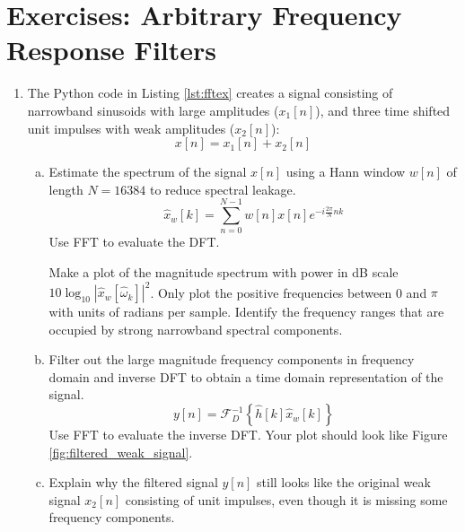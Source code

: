 \newpage
\section{Exercises: Arbitrary Frequency Response Filters}

\begin{enumerate}
\item The Python code in Listing \ref{lst:fftex} creates a signal consisting of narrowband sinusoids with large amplitudes ($x_1[n]$), and three time shifted unit impulses with weak amplitudes ($x_2[n]$):
  \begin{equation}
    x[n]=x_1[n]+x_2[n]
    \end{equation}

  
  
  \begin{enumerate}[a)]
  \item Estimate the spectrum of the signal $x[n]$ using a Hann window $w[n]$ of length $N=16384$ to reduce spectral leakage.
    \begin{equation}
      \hat{x}_w[k]= \sum_{n=0}^{N-1}w[n]x[n]e^{-i\frac{2\pi}{N}nk}
      \end{equation}
      Use FFT to evaluate the DFT.

    Make a plot of the magnitude spectrum with power in dB scale
    $10\log_{10}|\hat{x}_w[\hat{\omega}_k]|^2$. Only plot the positive
    frequencies between 0 and $\pi$ with units of radians per
    sample. Identify the frequency ranges that are occupied by strong
    narrowband spectral components.
    
  \item Filter out the large magnitude frequency components in
    frequency domain and inverse DFT to obtain a time domain
    representation of the signal.
    \begin{equation}
    y[n]= \mathcal{F}_D^{-1}\left\{ \hat{h}[k]\hat{x}_w[k] \right\}
    \end{equation}
    Use FFT to evaluate the inverse DFT. Your plot should look like
    Figure \ref{fig:filtered_weak_signal}.
    
    \item Explain why the filtered signal $y[n]$ still looks like the
      original weak signal $x_2[n]$ consisting of unit impulses, even
      though it is missing some frequency components.
    \end{enumerate}
    
\end{enumerate}
